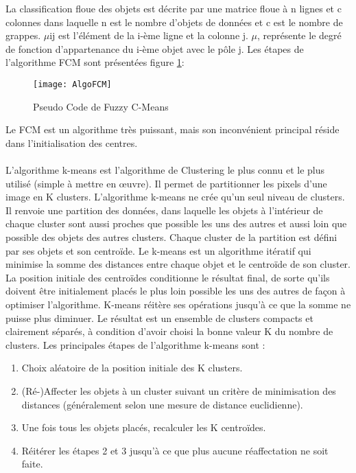 La classification floue des objets est décrite par une matrice floue à n lignes et c colonnes dans laquelle n est le nombre d’objets de données et c est le nombre de grappes. $\mu$ij est l’élément de la i-ème ligne et la colonne j. $\mu$, représente le degré de fonction d’appartenance du i-ème objet avec le pôle j.
Les étapes de l’algorithme FCM sont présentées figure \ref{fig:ALGOFCM}:

\begin{figure}[H]
  \centering
  \texttt{[image: AlgoFCM]}
  \caption{Pseudo Code de Fuzzy C-Means}
  \label{fig:ALGOFCM}
\end{figure}

Le FCM est un algorithme très puissant, mais son inconvénient principal réside dans l’initialisation des centres.

\paragraph{}
L’algorithme k-means est l’algorithme de Clustering le plus connu et le plus utilisé (simple à mettre en œuvre). Il permet de partitionner les pixels d’une image en K clusters. L’algorithme k-means ne crée qu’un seul niveau de clusters. Il renvoie une partition des données, dans laquelle les objets à l’intérieur de chaque cluster sont aussi proches que possible les uns des autres et aussi loin que possible des objets des autres clusters. Chaque cluster de la partition est défini par ses objets et son centroïde. Le k-means est un algorithme itératif qui minimise la somme des distances entre chaque objet et le centroïde de son cluster. La position initiale des centroïdes conditionne le résultat final, de sorte qu'ils doivent être initialement placés le plus loin possible les uns des autres de façon à optimiser l’algorithme. K-means réitère ses opérations jusqu’à ce que la somme ne puisse plus diminuer. Le résultat est un ensemble de clusters compacts et clairement séparés, à condition d’avoir choisi la bonne valeur K du nombre de clusters. Les principales étapes de l’algorithme k-means sont :
\begin{enumerate}
\item Choix aléatoire de la position initiale des K clusters.
\item (Ré-)Affecter les objets à un cluster suivant un critère de minimisation des distances (généralement selon une mesure de distance euclidienne).
\item Une fois tous les objets placés, recalculer les K centroïdes.
\item Réitérer les étapes 2 et 3 jusqu’à ce que plus aucune réaffectation ne soit faite.
\end{enumerate}
